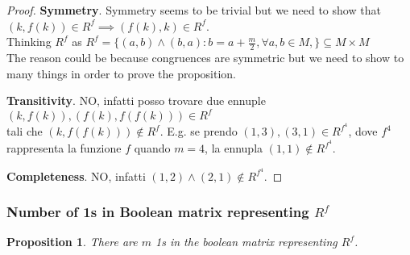 \documentclass{article}
\newtheorem{prop}{Proposition}
\begin{document}
\begin{proof}
  \textbf{Symmetry}. Symmetry seems to be trivial but we need to show that $(k, f(k)) \in R^f \implies (f(k), k) \in R^f$. \\
  Thinking $R^f$ as $R^f = \{(a,b) \wedge (b, a) : b = a + \frac{m}{2}, \forall a, b \in M, \} \subseteq M \times M$ \\
  The reason could be because congruences are symmetric but we need to show to many things in order to prove the proposition.
  
  \medskip
  
  \textbf{Transitivity}. NO, infatti posso trovare due ennuple $(k, f(k)), (f(k),f(f(k))) \in R^f$ \\
 tali che $(k, f(f(k))) \not\in R^f$. E.g. se prendo $(1,3), (3,1) \in R^{f^4}$, dove $f^4$ rappresenta la funzione $f$ quando $m=4$, la ennupla $(1,1) \not\in R^{f^4}$.
 
  \medskip
  
  \textbf{Completeness}. NO, infatti $(1,2) \wedge (2,1) \not\in R^{f^4}$.
\end{proof}

\subsubsection{Number of 1s in Boolean matrix representing $R^f$}
\begin{prop}
There are $m$ 1s in the boolean matrix representing $R^f$.
\end{prop}

\end{document}
